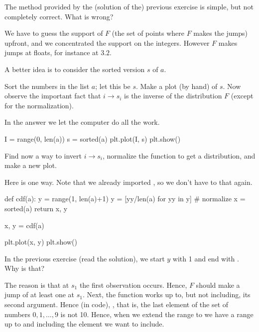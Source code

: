 \begin{exercise}\label{ex:2}
  The method provided by the (solution of the) previous exercise is simple, but not completely correct. What is wrong?
  \begin{solution}
    We have to guess the support of $F$ (the set of points where $F$ makes the jumps) upfront, and we concentrated the support on the integers. However $F$ makes jumps at floats, for instance  at $3.2$. 
  \end{solution}
\end{exercise}

A better idea is to consider the sorted version $s$ of $a$. 

\begin{exercise}
  Sort the numbers in the list $a$; let this be $s$.  Make a plot (by hand) of $s$.  Now observe the important fact that $i\to s_i$ is the inverse of the distribution $F$ (except for the normalization).
  \begin{solution}
    In the answer we let the computer do all the work.  

\begin{pyverbatim}
I = range(0, len(a))
s = sorted(a)
plt.plot(I, s)
plt.show()
\end{pyverbatim}
  \end{solution}
\end{exercise}

\begin{exercise}
  Find now a way to invert $i\to s_i$, normalize the function to get a distribution, and make a new plot. 
  \begin{solution}
Here is one way. Note that we already imported , so we don't have to that again.
\begin{pyverbatim}
def cdf(a):  
    y = range(1, len(a)+1)
    y = [yy/len(a) for yy in y] # normalize
    x = sorted(a)
    return x, y

x, y = cdf(a)

plt.plot(x, y)
plt.show()
\end{pyverbatim}


  \end{solution}
\end{exercise}

\begin{exercise}
In the previous exercise (read the solution), we start $y$ with 1 and end with . Why is that? 
  \begin{solution}
    The reason is that at $s_1$ the first observation occurs. Hence, $F$ should make a jump of at least one at $s_1$. Next, the  function works up to, but not including, its second argument. Hence (in code), , that is, the last element  of the set of numbers $0, 1, \ldots, 9$ is not 10. Hence, when we extend the range to  we have a range up to and including the element we want to include.
  \end{solution}
\end{exercise}

